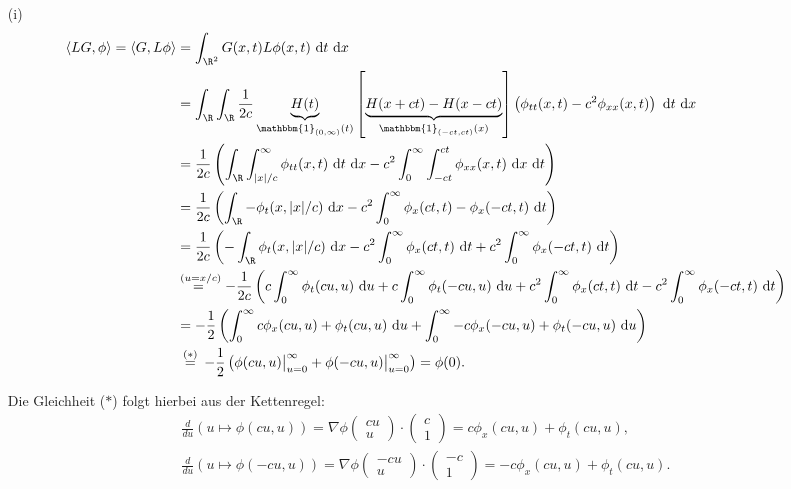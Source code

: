 \begin{solution}

\phantom{}
\begin{itemize}
    \item[(i)] \begin{align*}
    \langle LG, \phi \rangle = \langle G, L\phi \rangle &=
    \int_{\R^2} G(x, t) L\phi(x, t) \mathrm{~d}t \mathrm{~d}x \\
     &= \int_{\R} \int_{\R} \frac{1}{2c} \underbrace{H(t)}_{\mathbbm{1}_{(0, \infty)}(t)}
    \left[ \underbrace{H(x+ct) - H(x-ct)}_{\mathbbm{1}_{(-ct, ct)}(x)}\right]
    \left( \phi_{tt}(x, t) - c^2 \phi_{xx}(x, t) \right) \mathrm{~d}t \mathrm{~d}x \\
    &= \frac{1}{2c} \left(
    \int_\R \int_{|x|/c}^\infty \phi_{tt}(x, t) \mathrm{~d}t \mathrm{~d}x
    - c^2 \int_0^\infty \int_{-ct}^{ct} \phi_{xx}(x, t) \mathrm{~d}x \mathrm{~d}t \right)\\
    &= \frac{1}{2c} \left( \int_\R - \phi_t(x, |x|/c)\mathrm{~d}x
    - c^2 \int_0^\infty \phi_x(ct, t)  - \phi_x(-ct, t) \mathrm{~d}t \right)\\
    &= \frac{1}{2c}\left(- \int_\R \phi_t(x, |x|/c) \mathrm{~d}x
    - c^2 \int_0^\infty \phi_x(ct, t) \mathrm{~d}t + c^2
    \int_0^\infty \phi_x(-ct, t) \mathrm{~d}t\right)\\
    &\stackrel{(u = x/c)}{=~} - \frac{1}{2c} \left(c \int_0^\infty \phi_t(cu, u) \mathrm{~d}u + c
    \int_0^\infty \phi_t(-cu, u) \mathrm{~d}u + c^2 \int_0^\infty \phi_x(ct, t) \mathrm{~d}t
    - c^2\int_0^\infty \phi_x(-ct, t) \mathrm{~d}t\right) \\
    &= - \frac{1}{2} \left( \int_0^\infty c \phi_x(cu, u) + \phi_t(cu, u) \mathrm{~d}u +
    \int_0^\infty - c \phi_x(-cu, u) + \phi_t(-cu, u) \mathrm{~d}u \right) \\
    &\stackrel{(\ast)}{~=~} - \frac{1}{2}
    \left(\phi(cu, u) \big|_{u=0}^\infty + \phi(-cu, u) \big|_{u=0}^\infty \right) = \phi(0).
\end{align*}

Die Gleichheit ($\ast$) folgt hierbei aus der Kettenregel:
\begin{align*}
    \frac{d}{du} \left( u \mapsto \phi(cu, u) \right) = \nabla\phi\begin{pmatrix}cu\\u\end{pmatrix} \cdot \begin{pmatrix}c\\1\end{pmatrix} = c \phi_x(cu, u) + \phi_t (cu, u), \\
    \frac{d}{du} \left( u \mapsto \phi(-cu, u) \right) = \nabla\phi\begin{pmatrix}-cu\\u\end{pmatrix} \cdot \begin{pmatrix}-c\\1\end{pmatrix} = - c \phi_x(cu, u) + \phi_t (cu, u).
\end{align*}


\end{itemize}
\end{solution}
